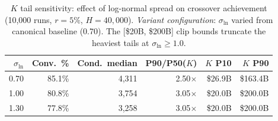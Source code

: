 \begin{table}[htbp]
\centering
\caption{$K$ tail sensitivity: effect of log-normal spread on crossover achievement (10{,}000 runs, $r = 5\%$, $H = 40{,}000$). \emph{Variant configuration}: $\sigma_{\ln}$ varied from canonical baseline (0.70). The [\$20B, \$200B] clip bounds truncate the heaviest tails at $\sigma_{\ln} \geq 1.0$.}
\label{tab:sigma_ln}
\small
\begin{tabular}{@{}rrrrrr@{}}
\toprule
$\sigma_{\ln}$ & Conv.\ \% & Cond.\ median & P90/P50($K$) & $K$ P10 & $K$ P90 \\
\midrule
0.70 & 85.1\% & 4{,}311 & 2.50$\times$ & \$26.9B & \$163.4B \\
1.00 & 80.8\% & 3{,}754 & 3.05$\times$ & \$20.0B & \$200.0B \\
1.30 & 77.8\% & 3{,}258 & 3.05$\times$ & \$20.0B & \$200.0B \\
\bottomrule
\end{tabular}
\end{table}
